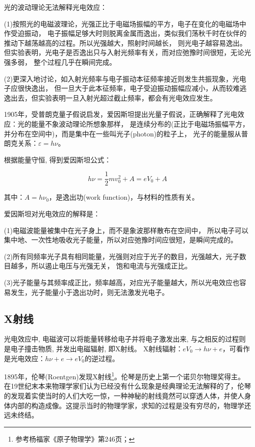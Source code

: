 光的波动理论无法解释光电效应：

(1)按照光的电磁波理论，光强正比于电磁场振幅的平方，电子在变化的电磁场中作受迫振动，
电子振幅足够大时则脱离金属而逸出，类似我们荡秋千时在伙伴的推动下越荡越高的过程。所以光强越大，照射时间越长，
则光电子越容易逸出。但实验表明，光电子是否逸出只与入射光频率有关，而对应弛豫时间很短，无论光强多弱，
整个过程几乎在瞬间完成。

(2)更深入地讨论，如入射光频率与电子振动本征频率接近则发生共振现象，光电子应很快逸出，
但一旦大于此本征频率，电子受迫振动振幅应减小，从而较难逃逸出去，但实验表明一旦入射光超过截止频率，都会有光电效应发生。


1905年，受普朗克量子假说启发，爱因斯坦提出光量子假说，正确解释了光电效应：光的能量不象波动理论所想象那样，
是连续分布的(正比于电磁场振幅平方，并分布在空间中)，而是集中在一些叫光子(photon)的粒子上，
光子的能量服从普朗克关系：$\varepsilon  = h\nu $。

根据能量守恒, 得到爱因斯坦公式：

\begin{equation}\label{Einstein phtoemission}
   h\nu  = \frac{1}{2}mv_0 ^2  + A = eV_0  + A
\end{equation}

其中：$A = h\nu _0 $，是逸出功(work function)，与材料的性质有关。

爱因斯坦对光电效应的解释是：

(1)电磁波能量被集中在光子身上，而不是象波那样散布在空间中，
所以电子可以集中地、一次性地吸收光子能量，所以对应弛豫时间应很短，是瞬间完成的。

(2)所有同频率光子具有相同能量，光强则对应于光子的数目，光强越大，光子数目越多，所以遏止电压与光强无关，
饱和电流与光强成正比。

(3)光子能量与其频率成正比，频率越高，对应光子能量越大，所以光电效应也容易发生，光子能量小于逸出功时，则无法激发光电子。


\subsection{X射线}

光电效应中, 电磁波可以将能量转移给电子并将电子激发出来,
与之相反的过程则是电子撞击物质, 并发出电磁辐射, 即X射线。
X射线辐射：$eV_0  \to h\nu  + e$，可看作是光电效应：$h\nu  + e \to eV_0 $的逆过程。


1895年，伦琴(Roentgen)发现X射线\footnote{参考杨福家《原子物理学》第246页；}。伦琴是历史上第一个诺贝尔物理奖得主。在19世纪末本来物理学家们认为已经没有什么现象是经典理论无法解释的了，伦琴的发现着实使当时的人们大吃一惊，一种神秘的射线竟然可以穿透人体，并使人身体内部的构造成像。这提示当时的物理学家，求知的过程是没有穷尽的，物理学还远未终结。

